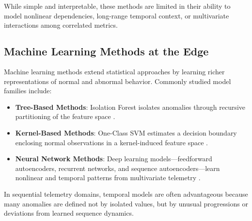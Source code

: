 While simple and interpretable, these methods are limited in their ability to model
nonlinear dependencies, long-range temporal context, or multivariate interactions among
correlated metrics.

\subsection{Machine Learning Methods at the Edge}
\label{subsec:edge_ml}

Machine learning methods extend statistical approaches by learning richer
representations of normal and abnormal behavior. Commonly studied model families
include:

\begin{itemize}
    \item \textbf{Tree-Based Methods}: Isolation Forest isolates anomalies through
    recursive partitioning of the feature space \cite{liu2008isolation}.

    \item \textbf{Kernel-Based Methods}: One-Class SVM estimates a decision boundary
    enclosing normal observations in a kernel-induced feature space
    \cite{scholkopf2001estimating}.

    \item \textbf{Neural Network Methods}: Deep learning models---feedforward
    autoencoders, recurrent networks, and sequence autoencoders---learn nonlinear and
    temporal patterns from multivariate telemetry \cite{chalapathy2019deep, pang2021deep}.
\end{itemize}

In sequential telemetry domains, temporal models are often advantageous because many
anomalies are defined not by isolated values, but by unusual progressions or deviations
from learned sequence dynamics.
